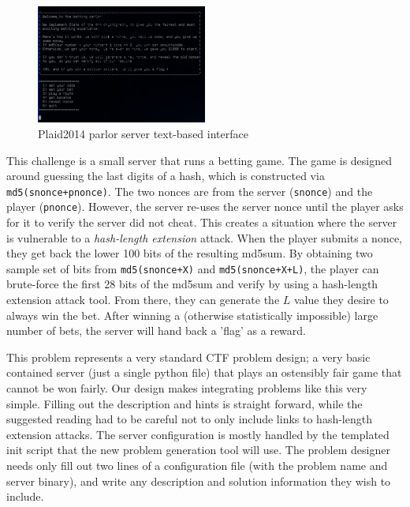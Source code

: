 \begin{figure}[h!]
\centering
\includegraphics[width=0.5\textwidth]{parlor_interface.png}
\caption{Plaid2014 parlor server text-based interface}\label{fig:parlor_interface}
\end{figure}


This challenge is a small server that runs a betting game. The game is
designed around guessing the last digits of a hash, which is
constructed via \texttt{md5(snonce+pnonce)}. The two nonces are from
the server (\texttt{snonce}) and the player
(\texttt{pnonce}). However, the server re-uses the server nonce until
the player asks for it to verify the server did not cheat. This
creates a situation where the server is vulnerable to a
\textit{hash-length extension} attack. When the player submits a
nonce, they get back the lower 100 bits of the resulting md5sum. By
obtaining two sample set of bits from \texttt{md5(snonce+X)} and
\texttt{md5(snonce+X+L)}, the player can brute-force the first 28 bits
of the md5sum and verify by using a hash-length extension attack
tool. From there, they can generate the $L$ value they desire to
always win the bet. After winning a (otherwise statistically
impossible) large number of bets, the server will hand back a 'flag'
as a reward.

This problem represents a very standard CTF problem design; a very
basic contained server (just a single python file) that plays an
ostensibly fair game that cannot be won fairly. Our design makes
integrating problems like this very simple. Filling out the
description and hints is straight forward, while the suggested reading
had to be careful not to only include links to hash-length extension
attacks. The server configuration is mostly handled by the templated
init script that the new problem generation tool will use. The problem
designer needs only fill out two lines of a configuration file (with
the problem name and server binary), and write any description and
solution information they wish to include.
